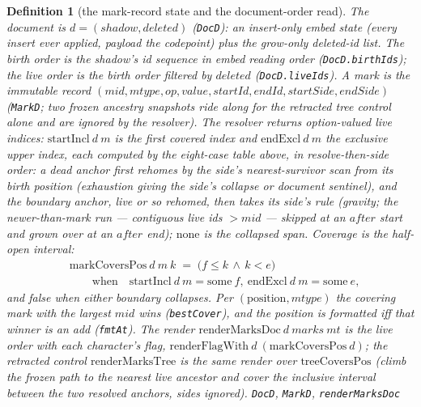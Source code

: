 \documentclass[11pt]{article}
\newtheorem{definition}[theorem]{Definition}
\newcommand{\lean}[1]{\texttt{#1}}
\begin{document}
\begin{definition}[the mark-record state and the document-order read]
\label{def:markmodel}
The document is $d = (\mathit{shadow}, \mathit{deleted})$
(\lean{DocD}): an insert-only embed state (every insert ever applied,
payload the codepoint) plus the grow-only deleted-id list. The
\emph{birth order} is the shadow's id sequence in embed reading order
(\lean{DocD.birthIds}); the \emph{live order} is the birth order
filtered by $\mathit{deleted}$ (\lean{DocD.liveIds}). A mark is the
immutable record $(\mathit{mid}, \mathit{mtype}, \mathit{op},
\mathit{value}, \mathit{startId}, \mathit{endId}, \mathit{startSide},
\mathit{endSide})$ (\lean{MarkD}; two frozen ancestry snapshots ride
along for the retracted tree control alone and are ignored by the
resolver). The resolver returns option-valued \emph{live indices}:
$\mathrm{startIncl}\ d\ m$ is the first covered index and
$\mathrm{endExcl}\ d\ m$ the exclusive upper index, each computed by
the eight-case table above, in \emph{resolve-then-side} order: a dead
anchor first rehomes by the side's nearest-survivor scan from its
birth position (exhaustion giving the side's collapse or document
sentinel), and the boundary anchor, live or so rehomed, then takes
its side's rule (gravity; the newer-than-mark run --- contiguous live
ids $> \mathit{mid}$ --- skipped at an $\mathit{after}$ start and
grown over at an $\mathit{after}$ end); $\mathrm{none}$ is the
collapsed span. Coverage is the
half-open interval:
\[
\begin{aligned}
  &\mathrm{markCoversPos}\ d\ m\ k \;=\;
  \bigl(f \le k \,\wedge\, k < e\bigr) \\
  &\qquad\text{when}\quad
  \mathrm{startIncl}\ d\ m = \mathrm{some}\ f,\
  \mathrm{endExcl}\ d\ m = \mathrm{some}\ e,
\end{aligned}
\]
and false when either boundary collapses. Per $(\text{position},
\mathit{mtype})$ the covering mark with the largest $\mathit{mid}$
wins (\lean{bestCover}), and the position is formatted iff that
winner is an \textsf{add} (\lean{fmtAt}). The render
$\mathrm{renderMarksDoc}\ d\ \mathit{marks}\ \mathit{mt}$ is the live
order with each character's flag,
$\mathrm{renderFlagWith}\ d\ (\mathrm{markCoversPos}\ d)$; the
retracted control $\mathrm{renderMarksTree}$ is the same render over
$\mathrm{treeCoversPos}$ (climb the frozen path to the nearest live
ancestor and cover the inclusive interval between the two resolved
anchors, sides ignored).
\hfill\lean{DocD}, \lean{MarkD}, \lean{renderMarksDoc}
\end{definition}
\end{document}

